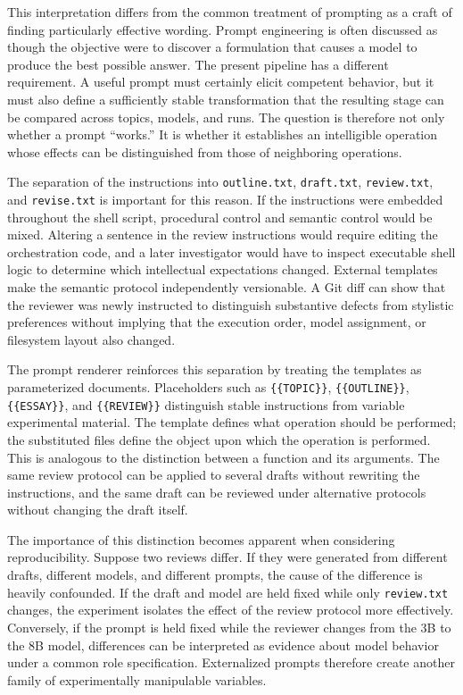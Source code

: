 \documentclass[11pt]{article}
\begin{document}
This interpretation differs from the common treatment of prompting as a craft of finding particularly effective wording. Prompt engineering is often discussed as though the objective were to discover a formulation that causes a model to produce the best possible answer. The present pipeline has a different requirement. A useful prompt must certainly elicit competent behavior, but it must also define a sufficiently stable transformation that the resulting stage can be compared across topics, models, and runs. The question is therefore not only whether a prompt ``works.'' It is whether it establishes an intelligible operation whose effects can be distinguished from those of neighboring operations.

The separation of the instructions into \texttt{outline.txt}, \texttt{draft.txt}, \texttt{review.txt}, and \texttt{revise.txt} is important for this reason. If the instructions were embedded throughout the shell script, procedural control and semantic control would be mixed. Altering a sentence in the review instructions would require editing the orchestration code, and a later investigator would have to inspect executable shell logic to determine which intellectual expectations changed. External templates make the semantic protocol independently versionable. A Git diff can show that the reviewer was newly instructed to distinguish substantive defects from stylistic preferences without implying that the execution order, model assignment, or filesystem layout also changed.

The prompt renderer reinforces this separation by treating the templates as parameterized documents. Placeholders such as \texttt{\{\{TOPIC\}\}}, \texttt{\{\{OUTLINE\}\}}, \texttt{\{\{ESSAY\}\}}, and \texttt{\{\{REVIEW\}\}} distinguish stable instructions from variable experimental material. The template defines what operation should be performed; the substituted files define the object upon which the operation is performed. This is analogous to the distinction between a function and its arguments. The same review protocol can be applied to several drafts without rewriting the instructions, and the same draft can be reviewed under alternative protocols without changing the draft itself.

The importance of this distinction becomes apparent when considering reproducibility. Suppose two reviews differ. If they were generated from different drafts, different models, and different prompts, the cause of the difference is heavily confounded. If the draft and model are held fixed while only \texttt{review.txt} changes, the experiment isolates the effect of the review protocol more effectively. Conversely, if the prompt is held fixed while the reviewer changes from the 3B to the 8B model, differences can be interpreted as evidence about model behavior under a common role specification. Externalized prompts therefore create another family of experimentally manipulable variables.
\end{document}
